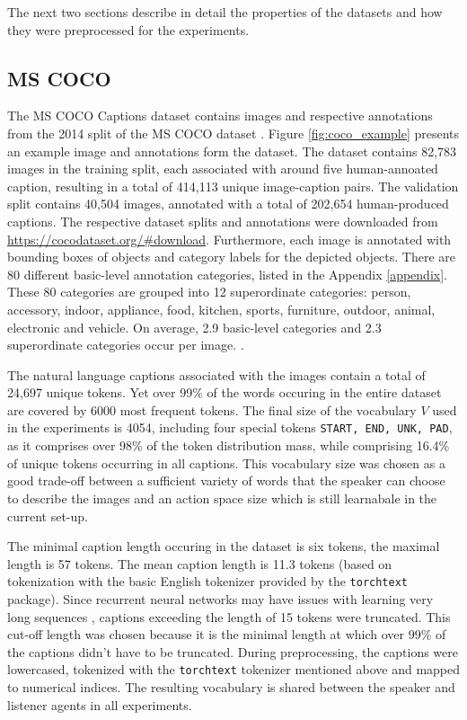 The next two sections describe in detail the properties of the datasets and how they were preprocessed for the experiments.

\subsection{MS COCO}
\label{ds:coco}
The MS COCO Captions dataset \parencite{chen2015microsoft} contains images and respective annotations from the 2014 split of the MS COCO dataset \parencite{lin2014microsoft}. Figure \ref{fig:coco_example} presents an example image and annotations form the dataset. The dataset contains 82,783 images in the training split, each associated with around five human-annoated caption, resulting in a total of 414,113 unique image-caption pairs. The validation split contains 40,504 images, annotated with a total of 202,654 human-produced captions. The respective dataset splits and annotations were downloaded from \url{https://cocodataset.org/#download}.
Furthermore, each image is annotated with bounding boxes of objects and category labels for the depicted objects. There are 80 different basic-level annotation categories, listed in the Appendix \ref{appendix}. These 80 categories are grouped into 12 superordinate categories: person, accessory, indoor, appliance, food, kitchen, sports, furniture, outdoor, animal, electronic and vehicle.
On average, 2.9 basic-level categories and 2.3 superordinate categories occur per image.
.

The natural language captions associated with the images contain a total of 24,697 unique tokens. Yet over 99\% of the words occuring in the entire dataset are covered by 6000 most frequent tokens. 
The final size of the vocabulary $V$ used in the experiments is 4054, including four special tokens \texttt{START, END, UNK, PAD}, as it comprises over 98\% of the token distribution mass, while comprising 16.4\% of unique tokens occurring in all captions. This vocabulary size was chosen as a good trade-off between a sufficient variety of words that the speaker can choose to describe the images and an action space size which is still learnabale in the current set-up. 

The minimal caption length occuring in the dataset is six tokens, the maximal length is 57 tokens. The mean caption length is 11.3 tokens (based on tokenization with the basic English tokenizer provided by the \texttt{torchtext} package). Since recurrent neural networks may have issues with learning very long sequences \parencite[e. g.,][]{jaeger2002tutorial}, captions exceeding the length of 15 tokens were truncated. This cut-off length was chosen because it is the minimal length at which over 99\% of the captions didn't have to be truncated. %
During preprocessing, the captions were lowercased, tokenized with the \texttt{torchtext} tokenizer mentioned above and mapped to numerical indices.  The resulting vocabulary is shared between the speaker and listener agents in all experiments. 

